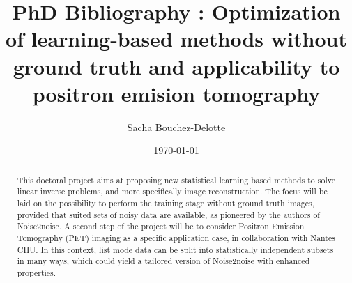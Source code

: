 \documentclass{report}
\title{PhD Bibliography : Optimization of learning-based methods without ground truth and applicability to positron emision tomography}
\author{Sacha Bouchez-Delotte}
\date{\today}
\theoremstyle{slanted}
\begin{document}
\maketitle

\newpage
\tableofcontents
\newpage

\begin{abstract}
This doctoral project aims at proposing new statistical learning based methods to solve linear inverse problems, and more specifically image reconstruction. The focus will be laid on the possibility to perform the training stage without ground truth images, provided that suited sets of noisy data are available, as pioneered by the authors of Noise2noise. A second step of the project will be to consider Positron Emission Tomography (PET) imaging as a specific application case, in collaboration with Nantes CHU. In this context, list mode data can be split into statistically independent subsets in many ways, which could yield a tailored version of Noise2noise with enhanced properties.
\end{abstract}

\newpage



\newpage



\newpage


\newpage
\appendix



\clearpage

\printglossary[type=\acronymtype]
\printglossary

\newpage
\printbibliography
\end{document}
